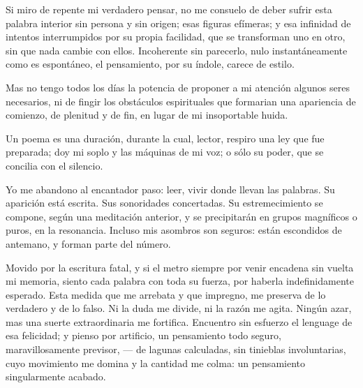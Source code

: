



\bigskip

Si miro de repente mi verdadero pensar, no me consuelo de deber sufrir
esta palabra interior sin persona y sin origen; esas figuras efímeras;
y esa infinidad de intentos interrumpidos por su propia facilidad, que
se transforman uno en otro, sin que nada cambie con ellos. Incoherente
sin parecerlo, nulo instantáneamente como es espontáneo, el
pensamiento, por su índole, carece de estilo.

Mas no tengo todos los días la potencia de proponer a mi atención
algunos seres necesarios, ni de fingir los obstáculos espirituales que
formarian una apariencia de comienzo, de plenitud y de fin, en lugar
de mi insoportable huida.

Un poema es una duración, durante la cual, lector, respiro una ley que
fue preparada; doy mi soplo y las máquinas de mi voz; o sólo su poder,
que se concilia con el silencio.

Yo me abandono al encantador paso: leer, vivir donde llevan las
palabras. Su aparición está escrita. Sus sonoridades concertadas. Su
estremecimiento se compone, según una meditación anterior, y se
precipitarán en grupos magníficos o puros, en la resonancia. Incluso
mis asombros son seguros: están escondidos de antemano, y forman parte
del número.

Movido por la escritura fatal, y si el metro siempre por venir
encadena sin vuelta mi memoria, siento cada palabra con toda su
fuerza, por haberla indefinidamente esperado. Esta medida que me
arrebata y que impregno, me preserva de lo verdadero y de lo falso. Ni
la duda me divide, ni la razón me agita. Ningún azar, mas una suerte
extraordinaria me fortifica. Encuentro sin esfuerzo el lenguage de esa
felicidad; y pienso por artificio, un pensamiento todo seguro,
maravillosamente previsor, --- de lagunas calculadas, sin tinieblas
involuntarias, cuyo movimiento me domina y la cantidad me colma: un
pensamiento singularmente acabado.

\newpage



\bigskip

